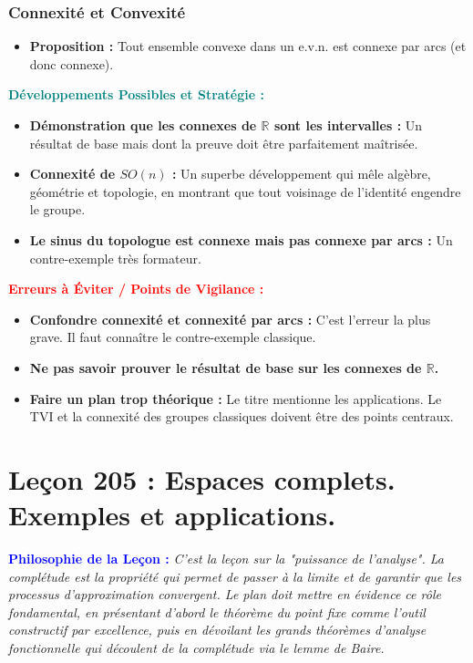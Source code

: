 \documentclass[12pt, a4paper, parskip=full]{report}
\theoremstyle{agregstyle}
\newenvironment{philosophie}
  {\par\medskip\noindent\begin{oframed}\noindent\textbf{\textcolor{blue}{Philosophie de la Leçon :}}\itshape}
  {\end{oframed}\par\medskip}
\newenvironment{developpements}
  {\par\medskip\noindent\begin{oframed}\noindent\textbf{\textcolor{teal}{Développements Possibles et Stratégie :}}}
  {\end{oframed}\par\medskip}
\newenvironment{erreurs}
  {\par\medskip\noindent\begin{oframed}\noindent\textbf{\textcolor{red}{Erreurs à Éviter / Points de Vigilance :}}}
  {\end{oframed}\par\medskip}
\begin{document}
\subsection{Connexité et Convexité}
\begin{itemize}
    \item \textbf{Proposition :} Tout ensemble convexe dans un e.v.n. est connexe par arcs (et donc connexe).
\end{itemize}

\begin{developpements}
    \begin{itemize}
        \item \textbf{Démonstration que les connexes de $\mathbb{R}$ sont les intervalles :} Un résultat de base mais dont la preuve doit être parfaitement maîtrisée.
        \item \textbf{Connexité de $SO(n)$ :} Un superbe développement qui mêle algèbre, géométrie et topologie, en montrant que tout voisinage de l'identité engendre le groupe.
        \item \textbf{Le sinus du topologue est connexe mais pas connexe par arcs :} Un contre-exemple très formateur.
    \end{itemize}
\end{developpements}

\begin{erreurs}
    \begin{itemize}
        \item \textbf{Confondre connexité et connexité par arcs :} C'est l'erreur la plus grave. Il faut connaître le contre-exemple classique.
        \item \textbf{Ne pas savoir prouver le résultat de base sur les connexes de $\mathbb{R}$.}
        \item \textbf{Faire un plan trop théorique :} Le titre mentionne les applications. Le TVI et la connexité des groupes classiques doivent être des points centraux.
    \end{itemize}
\end{erreurs}
\chapter{Leçon 205 : Espaces complets. Exemples et applications.}

\begin{philosophie}
    C'est la leçon sur la "puissance de l'analyse". La complétude est la propriété qui permet de passer à la limite et de garantir que les processus d'approximation convergent. Le plan doit mettre en évidence ce rôle fondamental, en présentant d'abord le théorème du point fixe comme l'outil constructif par excellence, puis en dévoilant les grands théorèmes d'analyse fonctionnelle qui découlent de la complétude via le lemme de Baire.
\end{philosophie}
\end{document}
